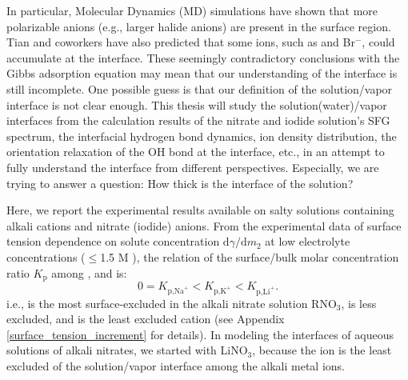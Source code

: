 %
In particular, Molecular Dynamics (MD) simulations have shown that more polarizable anions (e.g., larger halide anions) 
are present in the surface region\cite{Jungwirth2001,Jungwirth2002}. 
Tian and coworkers\cite{CST11} have also predicted that some ions, such as \I and Br$^{-}$, could accumulate at the interface.
These seemingly contradictory conclusions with the Gibbs adsorption equation may mean that our understanding of the interface is still incomplete. 
One possible guess is that our definition of the solution/vapor interface is not clear enough. 
This thesis will study the solution(water)/vapor interfaces from the calculation results of the nitrate and iodide solution's SFG spectrum, 
the interfacial hydrogen bond dynamics, ion density distribution, the orientation relaxation of the OH bond at the interface, etc., 
in an attempt to fully understand the interface from different perspectives. 
Especially, we are trying to answer a question: How thick is the interface of the solution?


Here, we report the experimental results available on salty solutions containing alkali cations and nitrate (iodide) anions\cite{PS03,AJ12,HuaWei2014}. 
From the experimental data of surface tension dependence on solute concentration $\text{d}\gamma/\text{d}m_2$ 
at low electrolyte concentrations ($\leq$1.5 M )\cite{Weissenborn95,Hey81,Jarvis68,Jarvis72}, 
the relation of the surface/bulk molar concentration ratio $K_{\text{p}}$\cite{Pegram2006} among \li, \Na and \K is: 
\begin{equation}
0=K_{\text{p,Na}^+}< K_{\text{p,K}^+}< K_{\text{p,Li}^+}.
\label{eq:bscr}
\end{equation}
i.e., \Na is the most surface-excluded in the alkali nitrate solution RNO$_3$, \K is less excluded, 
and \Li is the least excluded cation (see Appendix \ref{surface_tension_increment} for details).
In modeling the interfaces of aqueous solutions of alkali nitrates, we started with LiNO$_3$, 
because the \Li ion is the least excluded of the solution/vapor interface among the alkali metal ions. 

